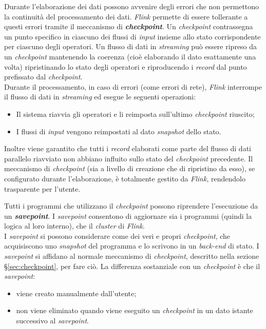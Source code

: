 \label{sec:checkpoint}
Durante l'elaborazione dei dati possono avvenire degli errori che non permettono la continuità del processamento dei dati. \textit{Flink} permette di essere tollerante a questi errori tramite il meccanismo di \textbf{\textit{checkpoint}}. Un \textit{checkpoint} contrassegna un punto specifico in ciascuno dei flussi di \textit{input} insieme allo stato corrispondente per ciascuno degli operatori. Un flusso di dati in \textit{streaming} può essere ripreso da un \textit{checkpoint} mantenendo la coerenza (cioè elaborando il dato esattamente una volta) ripristinando lo stato degli operatori e riproducendo i \textit{record} dal punto prefissato dal \textit{checkpoint}.\\
Durante il processamento, in caso di errori (come errori di rete), \textit{Flink} interrompe il flusso di dati in \textit{streaming} ed esegue le seguenti operazioni:
\begin{itemize}
	\item{Il sistema riavvia gli operatori e li reimposta sull'ultimo \textit{checkpoint} riuscito;}
	\item{I flussi di \textit{input} vengono reimpostati al dato \textit{\gls{snapshot}} dello stato.}
\end{itemize}
Inoltre viene garantito che tutti i \textit{record} elaborati come parte del flusso di dati parallelo riavviato non abbiano influito sullo stato del \textit{checkpoint} precedente.
Il meccanismo di \textit{checkpoint} (sia a livello di creazione che di ripristino da esso), se configurato durante l'elaborazione, è totalmente gestito da \textit{Flink}, rendendolo trasparente per l'utente.

Tutti i programmi che utilizzano il \textit{checkpoint} possono riprendere l'esecuzione da un \textbf{\textit{savepoint}}. I \textit{savepoint} consentono di aggiornare sia i programmi (quindi la logica al loro interno), che il \textit{\gls{cluster}} di \textit{Flink}.\\
I \textit{savepoint} si possono considerare come dei veri e propri \textit{checkpoint}, che acquisiscono uno \textit{\gls{snapshot}} del programma e lo scrivono in un \textit{back-end} di stato. I \textit{savepoint} si affidano al normale meccanismo di \textit{checkpoint}, descritto nella sezione \S\ref{sec:checkpoint}, per fare ciò. La differenza sostanziale con un \textit{checkpoint} è che il \textit{savepoint}:
\begin{itemize}
	\item{viene creato manualmente dall'utente;}
	\item{non viene eliminato quando viene eseguito un \textit{checkpoint} in un dato istante successivo al \textit{savepoint}.}
\end{itemize}


